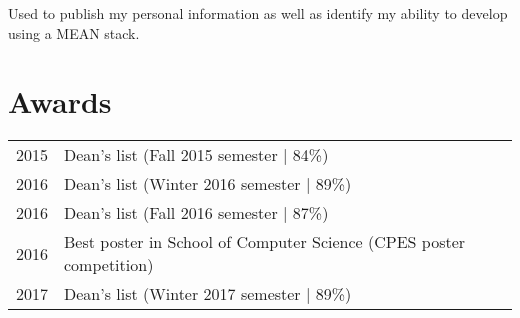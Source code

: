\documentclass[letterpaper]{deedy-resume} %
\begin{document}
\begin{minipage}[t]{0.74\textwidth}

\begin{tightitemize}
\item Used to publish my personal information as well as identify my ability to develop using a MEAN stack.
\end{tightitemize}
\sectionspace %



\section{Awards} 

\begin{tabular}{rll}
2015	 & Dean's list (Fall 2015 semester | 84\%)\\
2016	 & Dean's list (Winter 2016 semester | 89\%)\\
2016	 & Dean's list (Fall 2016 semester | 87\%)\\
2016 & Best poster in School of Computer Science (CPES poster competition)\\
2017 & Dean's list (Winter 2017 semester | 89\%)\\

\end{tabular}





\end{minipage} %








\end{document}
